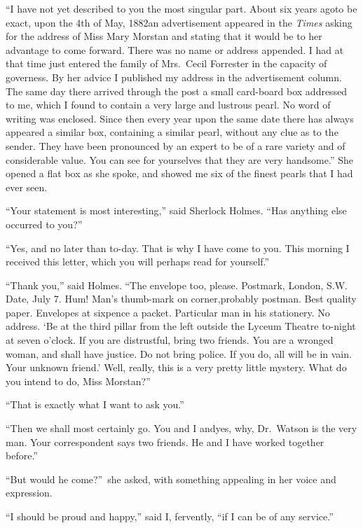 \documentclass[12pt,english,oneside]{book}
\begin{document}
{}``I have not yet described to you the most singular part. About
six years ago\mdsh{---}to be exact, upon the 4th of May, 1882\mdsh{---}an
advertisement appeared in the \emph{Times} asking for the address
of Miss Mary Morstan and stating that it would be to her advantage
to come forward. There was no name or address appended. I had at that
time just entered the family of Mrs.\ Cecil Forrester in the capacity
of governess. By her advice I published my address in the advertisement
column. The same day there arrived through the post a small card-board
box addressed to me, which I found to contain a very large and lustrous
pearl. No word of writing was enclosed. Since then every year upon
the same date there has always appeared a similar box, containing
a similar pearl, without any clue as to the sender. They have been
pronounced by an expert to be of a rare variety and of considerable
value. You can see for yourselves that they are very handsome.''
She opened a flat box as she spoke, and showed me six of the finest
pearls that I had ever seen.

{}``Your statement is most interesting,'' said Sherlock Holmes.
{}``Has anything else occurred to you?''

{}``Yes, and no later than to-day. That is why I have come to you.
This morning I received this letter, which you will perhaps read for
yourself.''

{}``Thank you,'' said Holmes. {}``The envelope too, please. Postmark,
London, S.W. Date, July 7. Hum! Man's thumb-mark on corner,\mdsh{---}probably
postman. Best quality paper. Envelopes at sixpence a packet. Particular
man in his stationery. No address. `Be at the third pillar from the
left outside the Lyceum Theatre to-night at seven o'clock. If you
are distrustful, bring two friends. You are a wronged woman, and shall
have justice. Do not bring police. If you do, all will be in vain.
Your unknown friend.' Well, really, this is a very pretty little mystery.
What do you intend to do, Miss Morstan?''

{}``That is exactly what I want to ask you.''

{}``Then we shall most certainly go. You and I and\mdsh{---}yes,
why, Dr.\ Watson is the very man. Your correspondent says two friends.
He and I have worked together before.''

{}``But would he come?''\ she asked, with something appealing in
her voice and expression.

{}``I should be proud and happy,'' said I, fervently, {}``if I
can be of any service.''
\end{document}
